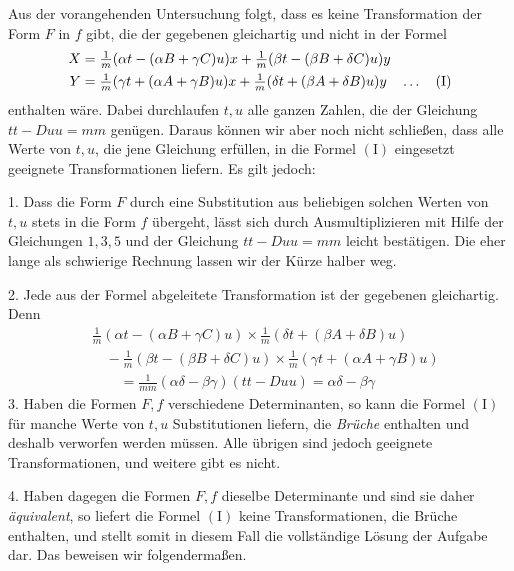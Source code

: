 Aus der vorangehenden Untersuchung folgt, dass es keine Transformation der Form $F$ in $f$ gibt, die der gegebenen gleichartig und nicht in der Formel
\[
\begin{aligned}
X&=\tfrac{1}{m}(\alpha t-(\alpha B+\gamma C)u)x+\tfrac{1}{m}(\beta t-(\beta B+\delta C)u)y\\
Y&=\tfrac{1}{m}(\gamma t+(\alpha A+\gamma B)u)x+\tfrac{1}{m}(\delta t+(\beta A+\delta B)u)y\quad\mathinner{.\,.\,.}\quad(\mathrm{I})
\end{aligned}
\]
enthalten wäre. Dabei durchlaufen $t,u$ alle ganzen Zahlen, die der Gleichung $tt-Duu=mm$ genügen. Daraus können wir aber noch nicht schließen, dass alle Werte von $t,u$, die jene Gleichung erfüllen, in die Formel $(\mathrm{I})$ eingesetzt geeignete Transformationen liefern. Es gilt jedoch:

1. Dass die Form $F$ durch eine Substitution aus beliebigen solchen Werten von $t,u$ stets in die Form $f$ übergeht, lässt sich durch Ausmultiplizieren mit Hilfe der Gleichungen $1,3,5$ und der Gleichung $tt-Duu=mm$ leicht bestätigen. Die eher lange als schwierige Rechnung lassen wir der Kürze halber weg.

2. Jede aus der Formel abgeleitete Transformation ist der gegebenen gleichartig. Denn
\[
\begin{aligned}
&\tfrac{1}{m}(\alpha t-(\alpha B+\gamma C)u)\times\tfrac{1}{m}(\delta t+(\beta A+\delta B)u)\\
&\quad-\tfrac{1}{m}(\beta t-(\beta B+\delta C)u)\times\tfrac{1}{m}(\gamma t+(\alpha A+\gamma B)u)\\
&\qquad=\tfrac{1}{mm}(\alpha\delta-\beta\gamma)(tt-Duu)=\alpha\delta-\beta\gamma
\end{aligned}
\]
3. Haben die Formen $F,f$ verschiedene Determinanten, so kann die Formel $(\mathrm{I})$ für manche Werte von $t,u$ Substitutionen liefern, die \textit{Brüche} enthalten und deshalb verworfen werden müssen. Alle übrigen sind jedoch geeignete Transformationen, und weitere gibt es nicht.

4. Haben dagegen die Formen $F,f$ dieselbe Determinante und sind sie daher \textit{äquivalent}, so liefert die Formel $(\mathrm{I})$ keine Transformationen, die Brüche enthalten,
und stellt somit in diesem Fall die vollständige Lösung der Aufgabe dar. Das beweisen wir folgendermaßen.


